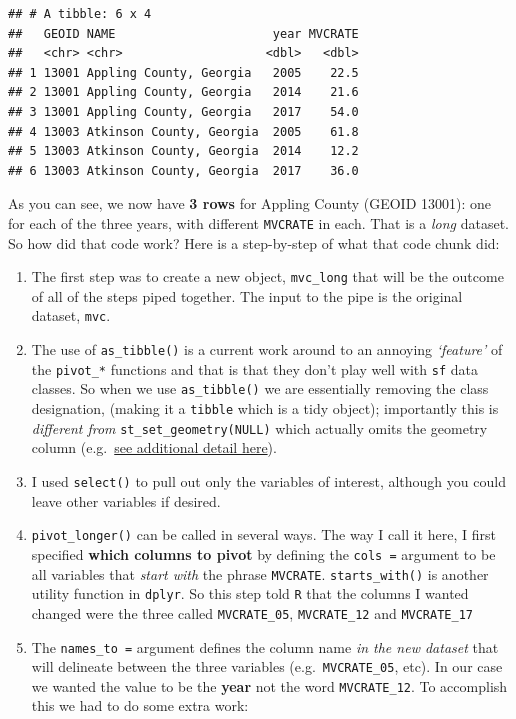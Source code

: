 \documentclass[
]{book}
\providecommand{\tightlist}{%
  \setlength{\itemsep}{0pt}\setlength{\parskip}{0pt}}
\begin{document}
\begin{verbatim}
## # A tibble: 6 x 4
##   GEOID NAME                      year MVCRATE
##   <chr> <chr>                    <dbl>   <dbl>
## 1 13001 Appling County, Georgia   2005    22.5
## 2 13001 Appling County, Georgia   2014    21.6
## 3 13001 Appling County, Georgia   2017    54.0
## 4 13003 Atkinson County, Georgia  2005    61.8
## 5 13003 Atkinson County, Georgia  2014    12.2
## 6 13003 Atkinson County, Georgia  2017    36.0
\end{verbatim}

As you can see, we now have \textbf{3 rows} for Appling County (GEOID 13001): one for each of the three years, with different \texttt{MVCRATE} in each. That is a \emph{long} dataset. So how did that code work? Here is a step-by-step of what that code chunk did:

\begin{enumerate}
\def\labelenumi{\arabic{enumi}.}
\tightlist
\item
  The first step was to create a new object, \texttt{mvc\_long} that will be the outcome of all of the steps piped together. The input to the pipe is the original dataset, \texttt{mvc}.
\item
  The use of \texttt{as\_tibble()} is a current work around to an annoying \emph{`feature'} of the \texttt{pivot\_*} functions and that is that they don't play well with \texttt{sf} data classes. So when we use \texttt{as\_tibble()} we are essentially removing the class designation, (making it a \texttt{tibble} which is a tidy object); importantly this is \emph{different from} \texttt{st\_set\_geometry(NULL)} which actually omits the geometry column (e.g.~\protect\hyperlink{sf_overview}{see additional detail here}).
\item
  I used \texttt{select()} to pull out only the variables of interest, although you could leave other variables if desired.
\item
  \texttt{pivot\_longer()} can be called in several ways. The way I call it here, I first specified \textbf{which columns to pivot} by defining the \texttt{cols\ =} argument to be all variables that \emph{start with} the phrase \texttt{MVCRATE}. \texttt{starts\_with()} is another utility function in \texttt{dplyr}. So this step told \texttt{R} that the columns I wanted changed were the three called \texttt{MVCRATE\_05}, \texttt{MVCRATE\_12} and \texttt{MVCRATE\_17}
\item
  The \texttt{names\_to\ =} argument defines the column name \emph{in the new dataset} that will delineate between the three variables (e.g.~\texttt{MVCRATE\_05}, etc). In our case we wanted the value to be the \textbf{year} not the word \texttt{MVCRATE\_12}. To accomplish this we had to do some extra work:
\end{enumerate}
\end{document}
